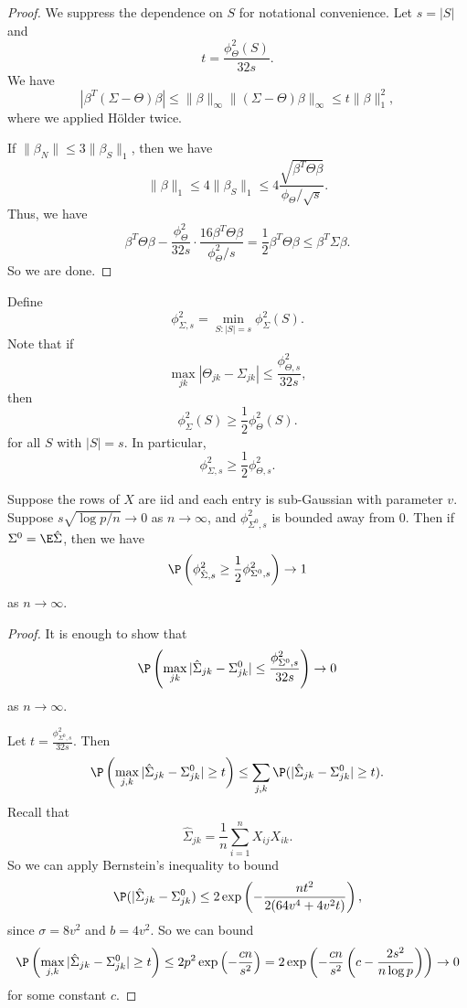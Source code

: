 \documentclass[a4paper]{article}
\begin{document}
\begin{proof}
  We suppress the dependence on $S$ for notational convenience. Let $s = |S|$ and
  \[
    t = \frac{\phi^2_\Theta(S)}{32s}.
  \]
  We have
  \[
    |\beta^T (\Sigma - \Theta) \beta| \leq \|\beta\|_\infty \|(\Sigma - \Theta) \beta\|_\infty \leq t\|\beta\|_1^2,
  \]
  where we applied H\"older twice.

  If $\|\beta_N\| \leq 3 \|\beta_S\|_1$, then we have
  \[
    \|\beta\|_1 \leq 4 \|\beta_S\|_1 \leq 4\frac{\sqrt{\beta^T \Theta \beta}}{\phi_\Theta/\sqrt{s}}.
  \]
  Thus, we have
  \[
    \beta^T \Theta \beta - \frac{\phi^2_\Theta}{32 s} \cdot \frac{16 \beta^T \Theta \beta}{\phi^2_\Theta /s} = \frac{1}{2} \beta^T \Theta \beta \leq \beta^T \Sigma \beta.
  \]
  So we are done.
\end{proof}

Define
\[
  \phi^2_{\Sigma, s} = \min_{S: |S| = s} \phi^2_\Sigma(S).
\]
Note that if
\[
  \max_{jk} |\Theta_{jk} - \Sigma_{jk}| \leq \frac{\phi^2_{\Theta, s}}{32 s},
\]
then
\[
  \phi^2_\Sigma(S) \geq \frac{1}{2} \phi^2_\Theta(S).
\]
for all $S$ with $|S| = s$. In particular,
\[
  \phi^2_{\Sigma, s} \geq \frac{1}{2} \phi^2_{\Theta, s}.
\]
\begin{thm}
  Suppose the rows of $X$ are iid and each entry is sub-Gaussian with parameter $v$. Suppose $s \sqrt{\log p / n} \to 0$ as $n \to \infty$, and $\phi^2_{\Sigma^0, s}$ is bounded away from $0$. Then if $\Sigma^0 = \E \hat{\Sigma}$, then we have
  \[
    \P\left(\phi^2_{\hat{\Sigma}, s} \geq \frac{1}{2} \phi^2_{\Sigma^0, s}\right) \to 1 %
  \]
  as $n \to \infty$.
\end{thm}

\begin{proof}
  It is enough to show that
  \[
    \P\left(\max_{jk} |\hat{\Sigma}_{jk} - \Sigma^0_{jk}| \leq \frac{\phi^2_{\Sigma^0, s}}{32 s}\right) \to 0
  \]
  as $n \to \infty$.

  Let $t = \frac{\phi_{\Sigma^0, s}^2}{32 s}$. Then
  \[
    \P \left(\max_{j,k} |\hat{\Sigma}_{jk} - \Sigma^0_{jk}| \geq t\right) \leq \sum_{j, k} \P(|\hat{\Sigma}_{jk} - \Sigma^0_{jk}| \geq t).
  \]
  Recall that
  \[
    \hat{\Sigma}_{jk} = \frac{1}{n} \sum_{i = 1}^n X_{ij} X_{ik}.
  \]
  So we can apply Bernstein's inequality to bound
  \[
    \P(|\hat{\Sigma}_{jk} - \Sigma^0_{jk}) \leq 2 \exp \left(-\frac{nt^2}{2 (64 v^4 + 4 v^2 t)}\right),
  \]
  since $\sigma = 8v^2$ and $b = 4 v^2$. So we can bound
  \[
    \P \left(\max_{j,k} |\hat{\Sigma}_{jk} - \Sigma^0_{jk}| \geq t\right) \leq 2 p^2 \exp \left( - \frac{c n}{s^2}\right) = 2 \exp \left(-\frac{c n}{s^2}\left(c - \frac{2s^2}{n \log p}\right)\right) \to 0
  \]
  for some constant $c$.
\end{proof}
\end{document}
